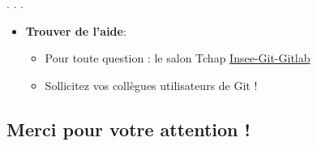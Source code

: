 \documentclass[
  letterpaper,
  DIV=11,
  numbers=noendperiod]{scrartcl}
\providecommand{\tightlist}{%
  \setlength{\itemsep}{0pt}\setlength{\parskip}{0pt}}\usepackage{longtable,booktabs,array}
\begin{document}
. . .

\begin{itemize}
\tightlist
\item
  \textbf{Trouver de l'aide}:

  \begin{itemize}
  \tightlist
  \item
    Pour toute question : le salon Tchap
    \href{https://tchap.gouv.fr/\#/room/\#InseeGitGitlablPtu8f1Frns:agent.finances.tchap.gouv.fr}{Insee-Git-Gitlab}
  \item
    Sollicitez vos collègues utilisateurs de Git !
  \end{itemize}
\end{itemize}

\hypertarget{merci-pour-votre-attention}{%
\subsection{Merci pour votre attention
!}\label{merci-pour-votre-attention}}
\end{document}
